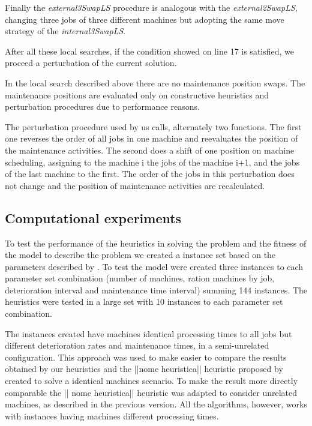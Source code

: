 \documentclass[a4paper,11pt]{article}
\begin{document}
Finally the \emph{external3SwapLS} procedure is analogous with the \emph{external2SwapLS}, changing three jobs of three different machines but adopting the same move strategy of the \emph{internal3SwapLS}. 

After all these local searches, if the condition showed on line 17 is satisfied, we proceed a perturbation of the current solution. 

In the local search described above there are no maintenance position swaps. The maintenance positions are evaluated only on constructive heuristics and perturbation procedures due to performance reasons. 

The perturbation procedure used by us calls, alternately two functions. The first one reverses the order of all jobs in one machine and reevaluates the position of the maintenance activities. The second does a shift of one position on machine scheduling, assigning to the machine i the jobs of the machine i+1, and  the jobs of the last machine to the first. The order of the jobs in this perturbation does not change and the position of maintenance activities are recalculated.  


\subsection{Computational experiments}

To test the performance of the heuristics in solving the problem and the fitness of the model to describe the problem we created a instance set based on the parameters described by \cite{ruiz2017makespan}. To test the model were created three instances to each parameter set combination (number of machines, ration machines by job, deterioration interval and maintenance time interval) summing 144 instances. The heuristics were tested in a large set with 10 instances to each parameter set combination.

The instances created have machines identical processing times to all jobs but different deterioration rates and maintenance times, in a semi-unrelated configuration. This approach was used to make easier to compare the results obtained by our heuristics and the ||nome heuristica|| heuristic proposed by \cite{ruiz2017makespan} created to solve a identical machines scenario. To make the result more directly comparable the || nome heuristica|| heuristic was adapted to consider unrelated machines, as described in the previous version. All the algorithms, however, works with instances having machines different processing times.  
\end{document}

